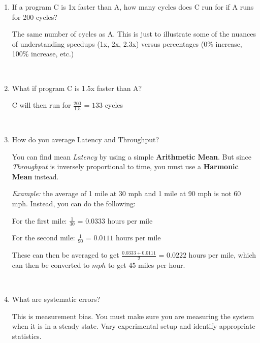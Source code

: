 \documentclass[12pt]{article}
\newenvironment{QandA}{\begin{enumerate}[label=\bfseries\arabic*.]\bfseries}
                      {\end{enumerate}}
\newenvironment{answered}{\par\quad\normalfont}{}
\begin{document}
\begin{QandA}
\begin{answered}
        $CPI_{B}$ = $0.5*1+0.2*3+0.1*1+0.2*2$ = $1.6$ CPI
        \end{answered}
        
        \
        
    \item If a program C is 1x faster than A, how many cycles does C run for if A runs for 200 cycles?
        \begin{answered}
        The same number of cycles as A. This is just to illustrate some of the nuances of understanding speedups (1x, 2x, 2.3x) versus percentages (0\% increase, 100\% increase, etc.)  
        \end{answered}
        
        \
    
    \item What if program C is 1.5x faster than A?
        \begin{answered}
        C will then run for $\frac{200}{1.5}$ = $133$ cycles
        \end{answered}
        
        \
        
    \item How do you average Latency and Throughput?
        \begin{answered}
        You can find mean \textit{Latency} by using a simple \textbf{Arithmetic Mean}. But since \textit{Throughput} is inversely proportional to time, you must use a \textbf{Harmonic Mean} instead. 
        
        \textit{Example:} the average of 1 mile at 30 mph and 1 mile at 90 mph is not 60 mph. Instead, you can do the following:
        
        For the first mile: $\frac{1}{30}$ = $0.0333$ hours per mile
        
        For the second mile: $\frac{1}{90}$ = $0.0111$ hours per mile
        
        These can then be averaged to get $\frac{0.0333+0.0111}{2}$ = $0.0222$ hours per mile, which can then be converted to $mph$ to get 45 miles per hour.
        \end{answered}
        
        \
        
    \item What are systematic errors?
        \begin{answered}
        This is measurement bias. You must make sure you are measuring the system when it is in a steady state. Vary experimental setup and identify appropriate statistics.
        \end{answered}
        

\end{QandA}
\end{document}
